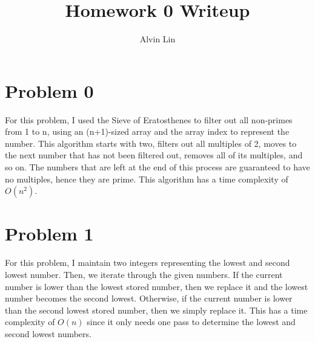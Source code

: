 \documentclass{article}
\title{Homework 0 Writeup}
\author{Alvin Lin}
\begin{document}
\maketitle

\section*{Problem 0}
For this problem, I used the Sieve of Eratosthenes to filter out all non-primes from 1 to n,
using an (n+1)-sized array and the array index to represent the number. This algorithm starts with two,
filters out all multiples of 2, moves to the next number that has not been filtered out, removes all
of its multiples, and so on. The numbers that are left at the end of this process are guaranteed to
have no multiples, hence they are prime. This algorithm has a time complexity of \( O(n^2) \).

\section*{Problem 1}
For this problem, I maintain two integers representing the lowest and second lowest number. Then, we
iterate through the given numbers. If the current number is lower than the lowest stored number, then
we replace it and the lowest number becomes the second lowest. Otherwise, if the current number is
lower than the second lowest stored number, then we simply replace it. This has a time complexity
of \( O(n) \) since it only needs one pass to determine the lowest and second lowest numbers.
\end{document}
